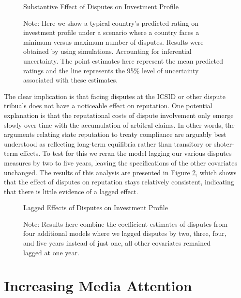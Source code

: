 \documentclass[12pt,onesided]{amsart}
\begin{document}

\begin{figure}[ht]
	\vspace{4cm}
	\centering
	\caption{Substantive Effect of Disputes on Investment Profile}
	\label{fig:subEffect}
	\resizebox{1\textwidth}{!}{}
	\caption*{Note: Here we show a typical country's predicted rating on investment profile under a scenario where a country faces a minimum versus maximum number of disputes. Results were obtained by using simulations. Accounting for inferential uncertainty. The point estimates here represent the mean predicted ratings and the line represents the 95\% level of uncertainty associated with these estimates.}
\end{figure}


The clear implication is that facing disputes at the ICSID or other dispute tribuals does not have a noticeable effect on reputation. One potential explanation is that the reputational costs of dispute involvement only emerge slowly over time with the accumulation of arbitral claims. In other words, the arguments relating state reputation to treaty compliance are arguably best understood as reflecting long-term equilibria rather than transitory or shoter-term effects.  To test for this we reran the model lagging our various disputes measures by two to five years, leaving the specifications of the other covariates unchanged. The results of this analysis are presented in Figure \ref{fig:lagEffect}, which shows that the effect of disputes on reputation stays relatively consistent, indicating that there is little evidence of a lagged effect.


\begin{figure}[ht]
	\vspace{3cm}
	\centering
	\caption{Lagged Effects of Disputes on Investment Profile}
	\label{fig:lagEffect}
	\resizebox{1\textwidth}{!}{}	
	\caption*{Note: Results here combine the coefficient estimates of disputes from four additional models where we lagged disputes by two, three, four, and five years instead of just one, all other covariates remained lagged at one year.}
\end{figure}


\section{Increasing Media Attention}
\end{document}
